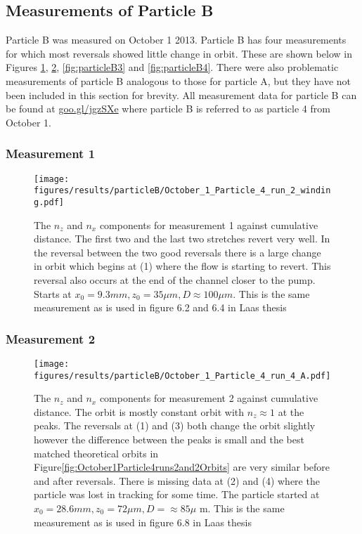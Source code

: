 \subsection{Measurements of Particle B}
Particle B was measured on October 1 2013. Particle B has four measurements for which most reversals showed little change in orbit. These are shown below in Figures \ref{fig:particleB1}, \ref{fig:particleB2}, \ref{fig:particleB3} and \ref{fig:particleB4}. There were also problematic measurements of particle B analogous to those for particle A, but they have not been included in this section for brevity. All measurement data for particle B can be found at \url{goo.gl/jgzSXe} where particle B is referred to as particle 4 from October 1. 

\subsubsection{Measurement 1}
\begin{figure}[H]
\begin{center}
\texttt{[image: figures/results/particleB/October\_1\_Particle\_4\_run\_2\_winding.pdf]}
\end{center}
\caption{The $n_z$ and $n_x$ components for measurement 1 against cumulative distance. The first two and the last two stretches revert very well. In the reversal between the two good reversals there is a large change in orbit which begins at (1) where the flow is starting to revert. This reversal also occurs at the end of the channel closer to the pump. Starts at $ x_0 = 9.3 mm, z_0 = 35\mu m, D \approx 100\mu m$. This is the same measurement as is used in figure 6.2 and 6.4 in Laas thesis~\cite{alexanderThesis}}
\label{fig:particleB1}
\end{figure}
	


\subsubsection{Measurement 2}

\begin{figure}[H]
\begin{center}
\texttt{[image: figures/results/particleB/October\_1\_Particle\_4\_run\_4\_A.pdf]}
\end{center}
\caption{The $n_z$ and $n_x$ components for measurement 2 against cumulative distance. The orbit is mostly constant orbit with $n_z \approx 1$ at the peaks. The reversals at (1) and (3) both change the orbit slightly however the difference between the peaks is small and the best matched theoretical orbits in Figure\ref{fig:October1Particle4runs2and2Orbits} are very similar before and after reversals. There is missing data at (2) and (4) where the particle was lost in tracking for some time. The particle started at $x_0 = 28.6 mm, z_0 = 72\mu m, D = \approx 85\mu$ m. This is the same measurement as is used in figure 6.8 in Laas thesis~\cite{alexanderThesis}}
\label{fig:particleB2}
\end{figure}

